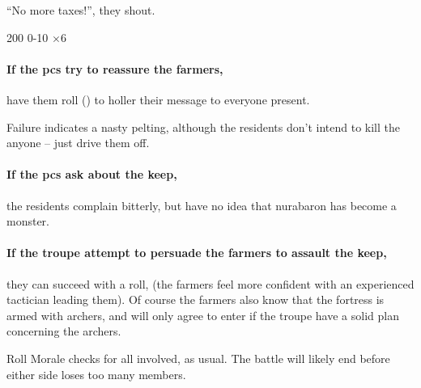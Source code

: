 \begin{multicols}{2}
\begin{boxtext}
  ``No more taxes!'', they shout.
\end{boxtext}

%
  {{2}{0}{0}}%
  {{0}{-1}{0}}%
  {%
    \Dagger
  }%
  {}%
  {\rock $\times 6$}%
  {}%

\paragraph{If the \glspl{pc} try to reassure the farmers,}
have them roll  (\tn[9]) to holler their message to everyone present.

Failure indicates a nasty pelting, although the residents don't intend to kill the anyone -- just drive them off.

\paragraph{If the \glspl{pc} ask about the keep,}
the residents complain bitterly, but have no idea that \gls{nurabaron} has become a monster.

\paragraph{If the troupe attempt to persuade the farmers to assault the keep,}
they can succeed with a  roll, \tn[10]
(the farmers feel more confident with an experienced tactician leading them).
Of course the farmers also know that the fortress is armed with archers, and will only agree to enter if the troupe have a solid plan concerning the archers.

Roll Morale checks for all involved, as usual.%
The battle will likely end before either side loses too many members.



\end{multicols}
